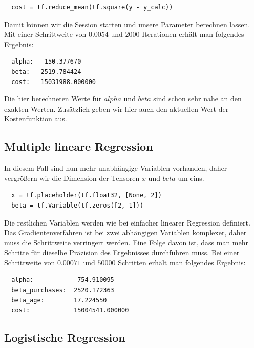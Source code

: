 \begin{verbatim}
  cost = tf.reduce_mean(tf.square(y - y_calc))
\end{verbatim}

Damit können wir die Session starten und unsere Parameter berechnen lassen. Mit einer Schrittweite von $0.0054$ und $2000$ Iterationen erhält man folgendes Ergebnis:

\begin{verbatim}
  alpha:  -150.377670
  beta:   2519.784424
  cost:   15031988.000000
\end{verbatim}

Die hier berechneten Werte für $alpha$ und $beta$ sind schon sehr nahe an den exakten Werten. Zusätzlich geben wir hier auch den aktuellen Wert der Kostenfunktion aus.

\subsection{Multiple lineare Regression}
\label{subsection:3:3:3}

In diesem Fall sind nun mehr unabhängige Variablen vorhanden, daher vergrößern wir die Dimension der Tensoren $x$ und $beta$ um eins.

\begin{verbatim}
  x = tf.placeholder(tf.float32, [None, 2])
  beta = tf.Variable(tf.zeros([2, 1]))
\end{verbatim}

Die restlichen Variablen werden wie bei einfacher linearer Regression definiert. Das Gradientenverfahren ist bei zwei abhängigen Variablen komplexer, daher muss die Schrittweite verringert werden. Eine Folge davon ist, dass man mehr Schritte für dieselbe Präzision des Ergebnisses durchführen muss. Bei einer Schrittweite von $0.00071$ und $50000$ Schritten erhält man folgendes Ergebnis:

\begin{verbatim}
  alpha:           -754.910095
  beta_purchases:  2520.172363
  beta_age:        17.224550
  cost:            15004541.000000
\end{verbatim}

\subsection{Logistische Regression}
\label{subsection:3:3:4}

